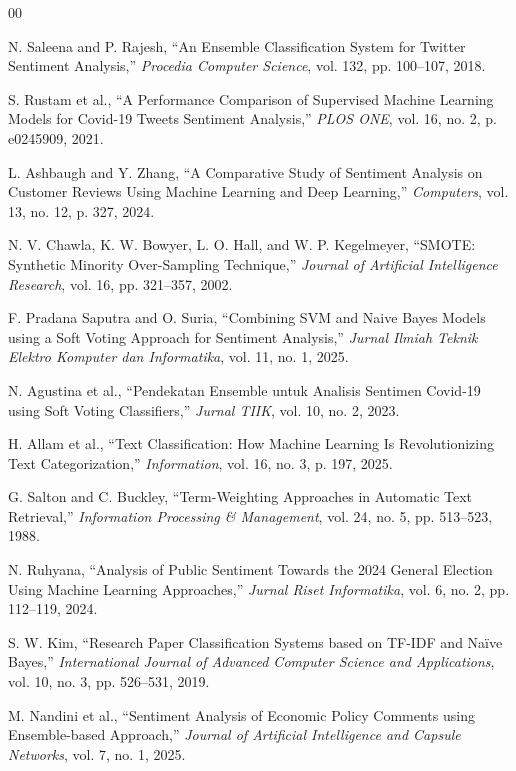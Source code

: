 \documentclass[conference]{IEEEtran}
\begin{document}
\begin{thebibliography}{00}

N. Saleena and P. Rajesh, ``An Ensemble Classification System for Twitter Sentiment Analysis,'' \textit{Procedia Computer Science}, vol. 132, pp. 100--107, 2018.

S. Rustam et al., ``A Performance Comparison of Supervised Machine Learning Models for Covid-19 Tweets Sentiment Analysis,'' \textit{PLOS ONE}, vol. 16, no. 2, p. e0245909, 2021.

L. Ashbaugh and Y. Zhang, ``A Comparative Study of Sentiment Analysis on Customer Reviews Using Machine Learning and Deep Learning,'' \textit{Computers}, vol. 13, no. 12, p. 327, 2024.

N. V. Chawla, K. W. Bowyer, L. O. Hall, and W. P. Kegelmeyer, ``SMOTE: Synthetic Minority Over-Sampling Technique,'' \textit{Journal of Artificial Intelligence Research}, vol. 16, pp. 321--357, 2002.

F. Pradana Saputra and O. Suria, ``Combining SVM and Naive Bayes Models using a Soft Voting Approach for Sentiment Analysis,'' \textit{Jurnal Ilmiah Teknik Elektro Komputer dan Informatika}, vol. 11, no. 1, 2025.

N. Agustina et al., ``Pendekatan Ensemble untuk Analisis Sentimen Covid-19 using Soft Voting Classifiers,'' \textit{Jurnal TIIK}, vol. 10, no. 2, 2023.

H. Allam et al., ``Text Classification: How Machine Learning Is Revolutionizing Text Categorization,'' \textit{Information}, vol. 16, no. 3, p. 197, 2025.

G. Salton and C. Buckley, ``Term-Weighting Approaches in Automatic Text Retrieval,'' \textit{Information Processing \& Management}, vol. 24, no. 5, pp. 513--523, 1988.

N. Ruhyana, ``Analysis of Public Sentiment Towards the 2024 General Election Using Machine Learning Approaches,'' \textit{Jurnal Riset Informatika}, vol. 6, no. 2, pp. 112--119, 2024.

S. W. Kim, ``Research Paper Classification Systems based on TF-IDF and Na\"{i}ve Bayes,'' \textit{International Journal of Advanced Computer Science and Applications}, vol. 10, no. 3, pp. 526--531, 2019.

M. Nandini et al., ``Sentiment Analysis of Economic Policy Comments using Ensemble-based Approach,'' \textit{Journal of Artificial Intelligence and Capsule Networks}, vol. 7, no. 1, 2025.


\end{thebibliography}
\end{document}
